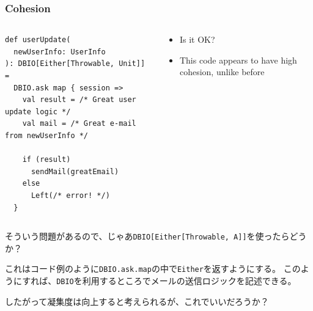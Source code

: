\begin{frame}[fragile]
  \frametitle{Cohesion}

   
  \begin{columns}
    \pause
    \begin{column}{0.6\textwidth}
\begin{lstlisting}[style=scala]
def userUpdate(
  newUserInfo: UserInfo
): DBIO[Either[Throwable, Unit]] =
  DBIO.ask map { session =>
    val result = /* Great user update logic */
    val mail = /* Great e-mail from newUserInfo */

    if (result)
      sendMail(greatEmail)
    else
      Left(/* error! */)
  }
\end{lstlisting}
    \end{column}
    \pause
    \begin{column}{0.4\textwidth}
      \begin{itemize}
        \item<+-> Is it OK?

        \item<+-> This code appears to have high cohesion, unlike before
      \end{itemize}
    \end{column}
  \end{columns}

  \begin{notes}
    \item そういう問題があるので、じゃあ\lstinline|DBIO[Either[Throwable, A]]|を使ったらどうか？

    \item これはコード例のように\lstinline|DBIO.ask.map|の中で\lstinline|Either|を返すようにする。
    このようにすれば、\lstinline|DBIO|を利用するところでメールの送信ロジックを記述できる。

    \item したがって凝集度は向上すると考えられるが、これでいいだろうか？
  \end{notes}
\end{frame}

